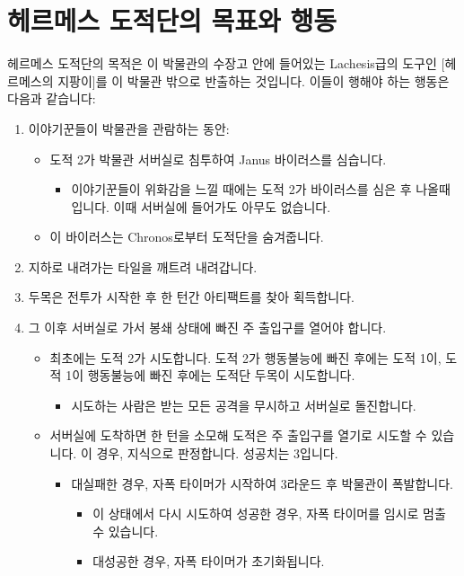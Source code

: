 \documentclass{report}
\begin{document}
	\section*{헤르메스 도적단의 목표와 행동}
	헤르메스 도적단의 목적은 이 박물관의 수장고 안에 들어있는 Lachesis급의 도구인 [헤르메스의 지팡이]를 이 박물관 밖으로 반출하는 것입니다. 이들이 행해야 하는 행동은 다음과 같습니다:
	\begin{enumerate}
		\item 이야기꾼들이 박물관을 관람하는 동안:
		\begin{itemize}
			\item 도적 2가 박물관 서버실로 침투하여 Janus 바이러스를 심습니다.
			\begin{itemize}
				\item 이야기꾼들이 위화감을 느낄 때에는 도적 2가 바이러스를 심은 후 나올때입니다. 이때 서버실에 들어가도 아무도 없습니다.
			\end{itemize}
			\item 이 바이러스는 Chronos로부터 도적단을 숨겨줍니다.
		\end{itemize}
		\item 지하로 내려가는 타일을 깨트려 내려갑니다.
		\item 두목은 전투가 시작한 후 한 턴간 아티팩트를 찾아 획득합니다.
		\item 그 이후 서버실로 가서 봉쇄 상태에 빠진 주 출입구를 열어야 합니다.
		\begin{itemize}
			\item 최초에는 도적 2가 시도합니다. 도적 2가 행동불능에 빠진 후에는 도적 1이, 도적 1이 행동불능에 빠진 후에는 도적단 두목이 시도합니다.
			\begin{itemize}
				\item 시도하는 사람은 받는 모든 공격을 무시하고 서버실로 돌진합니다.
			\end{itemize}
			\item 서버실에 도착하면 한 턴을 소모해 도적은 주 출입구를 열기로 시도할 수 있습니다. 이 경우, 지식으로 판정합니다. 성공치는 3입니다.
			\begin{itemize}
				\item 대실패한 경우, 자폭 타이머가 시작하여 3라운드 후 박물관이 폭발합니다.
				\begin{itemize}
					\item 이 상태에서 다시 시도하여 성공한 경우, 자폭 타이머를 임시로 멈출 수 있습니다.
					\item 대성공한 경우, 자폭 타이머가 초기화됩니다.
				\end{itemize}

\end{itemize}
\end{itemize}
\end{enumerate}
\end{document}
